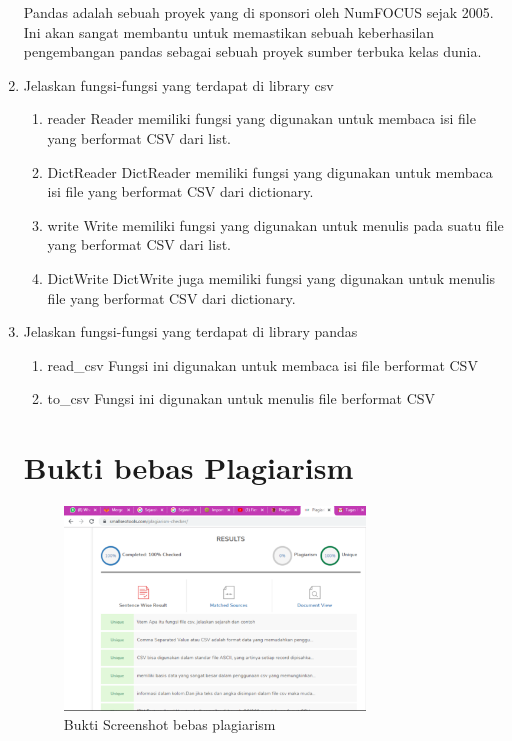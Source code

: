 \documentclass[a4paper, 12pt]{article}
\begin{document}
\begin{enumerate}
\hfill\break
Pandas adalah sebuah proyek yang di sponsori oleh NumFOCUS sejak 2005. Ini akan sangat membantu untuk memastikan sebuah keberhasilan pengembangan pandas sebagai sebuah proyek sumber terbuka kelas dunia.
\item Jelaskan fungsi-fungsi yang terdapat di library csv
\begin{enumerate}
\item reader
\hfill\break
	Reader memiliki fungsi yang digunakan untuk membaca isi file yang berformat CSV dari list.
	
\item DictReader
\hfill\break
	DictReader memiliki fungsi yang digunakan untuk membaca isi file yang berformat CSV dari dictionary.
	
\item write
\hfill\break
	Write memiliki fungsi yang digunakan untuk menulis pada suatu file yang berformat CSV dari list.
	
\item DictWrite
\hfill\break
	DictWrite juga memiliki fungsi yang digunakan untuk menulis file yang berformat CSV dari dictionary.
	
\end{enumerate}
\item Jelaskan fungsi-fungsi yang terdapat di library pandas
\begin{enumerate}
\item read\_csv
\hfill\break
	Fungsi ini digunakan untuk membaca isi file berformat CSV
	
\item to\_csv
\hfill\break
	Fungsi ini digunakan untuk menulis file berformat CSV
	
\end{enumerate}
\section{Bukti bebas Plagiarism}
\begin{figure}[H]
			\includegraphics[width=8cm]{figures/ss1.png}
			\centering
			\caption{Bukti Screenshot bebas plagiarism}
	\end{figure}

\end{enumerate}
\end{document}
